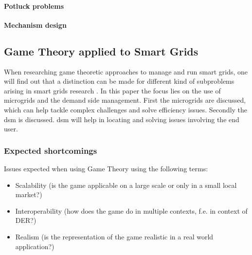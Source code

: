 \paragraph{Potluck problems}

\paragraph{Mechanism design}


\subsection{Game Theory applied to Smart Grids}
When researching game theoretic approaches to manage and run smart grids, one will find out that a distinction can be made for different kind of subproblems arising in smart grids research \cite{keypaper}. In this paper the focus lies on the use of microgrids and the demand side management. First the microgrids are discussed, which can help tackle complex challenges and solve efficiency issues. Secondly the \gls{dsm} is discussed. \gls{dsm} will help in locating and solving issues involving the end user. 


\subsubsection{Expected shortcomings}

Issues expected when using Game Theory using the following terms:
\begin{itemize}
	\item Scalability (is the game applicable on a large scale or only in a small local market?)
	\item Interoperability (how does the game do in multiple contexts, f.e. in context of DER?)
	\item Realism (is the representation of the game realistic in a real world application?)
\end{itemize}
